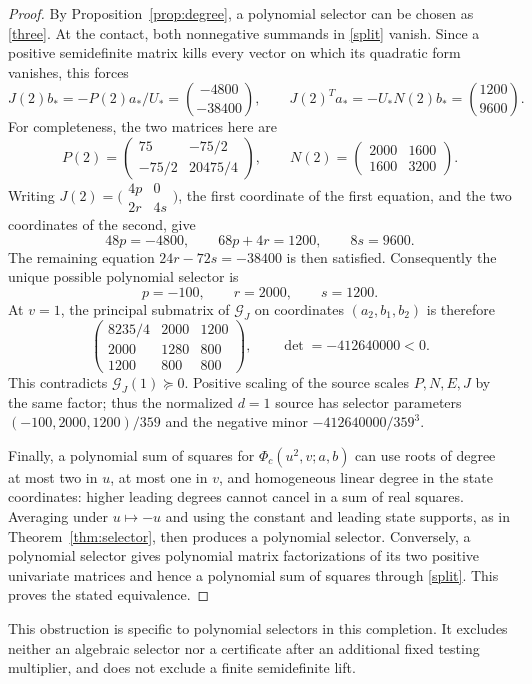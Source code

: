 \begin{proof}
By Proposition~\ref{prop:degree}, a polynomial selector can be chosen as
\eqref{three}. At the contact, both nonnegative summands in
\eqref{split} vanish. Since a positive semidefinite matrix kills every
vector on which its quadratic form vanishes, this forces
\begin{equation}
 J(2)b_*=-P(2)a_*/U_*=\binom{-4800}{-38400},\qquad
 J(2)^Ta_*=-U_*N(2)b_*=\binom{1200}{9600}.
 \label{kernel}
\end{equation}
For completeness, the two matrices here are
\[
 P(2)=\begin{pmatrix}75&-75/2\\-75/2&20475/4\end{pmatrix},
 \qquad
 N(2)=\begin{pmatrix}2000&1600\\1600&3200\end{pmatrix}.
\]
Writing $J(2)=\bigl(\begin{smallmatrix}4p&0\\2r&4s\end{smallmatrix}\bigr)$,
the first coordinate of the first equation, and the two coordinates of
the second, give
\[
 48p=-4800,\qquad 68p+4r=1200,\qquad 8s=9600.
\]
The remaining equation $24r-72s=-38400$ is then satisfied.
Consequently the unique possible polynomial selector is
\begin{equation}
 p=-100,\qquad r=2000,\qquad s=1200.
 \label{forced}
\end{equation}
At $v=1$, the principal submatrix of $\mathcal G_J$ on coordinates
$(a_2,b_1,b_2)$ is therefore
\begin{equation}
 \begin{pmatrix}
 8235/4&2000&1200\\
 2000&1280&800\\
 1200&800&800
 \end{pmatrix},
 \qquad \det=-412640000<0.
 \label{minor}
\end{equation}
This contradicts $\mathcal G_J(1)\succeq0$.
Positive scaling of the source scales $P,N,E,J$ by the same factor;
thus the normalized $d=1$ source has selector parameters
$(-100,2000,1200)/359$ and the negative minor
$-412640000/359^3$.

Finally, a polynomial sum of squares for $\Phi_c(u^2,v;a,b)$ can use
roots of degree at most two in $u$, at most one in $v$, and homogeneous
linear degree in the state coordinates: higher leading degrees cannot
cancel in a sum of real squares. Averaging under $u\mapsto-u$ and using
the constant and leading state supports, as in
Theorem~\ref{thm:selector}, then produces a polynomial selector.
Conversely, a polynomial selector gives polynomial matrix factorizations
of its two positive univariate matrices and hence a polynomial sum of
squares through \eqref{split}. This proves the stated equivalence.
\end{proof}

This obstruction is specific to polynomial selectors in this completion.
It excludes neither an algebraic selector nor a certificate after an
additional fixed testing multiplier, and does not exclude a finite
semidefinite lift.
